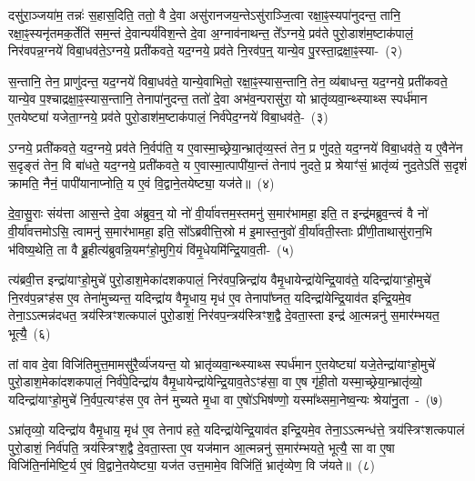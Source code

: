 दसु॑रा॒ञ्जया॑म॒ तन्नः॑ स॒हास॒दिति॒ ततो॒ वै दे॒वा असु॑रानजय॒न्ते\-ऽसु॑राञ्जि॒त्वा रक्षा॒ꣴ॒स्यपा॑नुदन्त॒ तानि॒ रक्षा॒ꣴ॒स्यनृ॑तमक॒र्तेति॑ सम॒न्तं दे॒वान्पर्य॑विश॒न्ते दे॒वा अ॒ग्नाव॑नाथन्त॒ ते᳚\-ऽग्नये॒ प्रव॑ते पुरो॒डाश॑\-म॒ष्टा\-क॑पालं॒ निर॑वपन्न॒ग्नये॑ विबा॒धव॑ते॒\-ऽग्नये॒ प्रती॑कवते॒ यद॒ग्नये॒ प्रव॑ते नि॒रव॑प॒न्॒ यान्ये॒व पु॒रस्ता॒द्रक्षा॒ꣴ॒स्या-~(२)

स॒न्तानि॒ तेन॒ प्राणु॑दन्त॒ यद॒ग्नये॑ विबा॒धव॑ते॒ यान्ये॒वाभितो॒ रक्षा॒ꣴ॒स्यास॒न्तानि॒ तेन॒ व्य॑बाधन्त॒ यद॒ग्नये॒ प्रती॑कवते॒ यान्ये॒व प॒श्चाद्रक्षा॒ꣴ॒स्यास॒न्तानि॒ तेनापा॑नुदन्त॒ ततो॑ दे॒वा अभ॑व॒न्परासु॑रा॒ यो भ्रातृ॑व्यवा॒न्थ्स्याथ्स स्पर्ध॑मान ए॒तयेष्ट्या॑ यजेता॒ग्नये॒ प्रव॑ते पुरो॒डाश॑\-म॒ष्टा\-क॑पालं॒ निर्व॑पेद॒ग्नये॑ विबा॒धव॑ते॒-~(३)

ऽग्नये॒ प्रती॑कवते॒ यद॒ग्नये॒ प्रव॑ते नि॒र्वप॑ति॒ य ए॒वास्मा॒\-च्छ्रेया॒न्भ्रातृ॑व्य॒स्तं तेन॒ प्र णु॑दते॒ यद॒ग्नये॑ विबा॒धव॑ते॒ य ए॒वैने॑न स॒दृङ्तं तेन॒ वि बा॑धते॒ यद॒ग्नये॒ प्रती॑कवते॒ य ए॒वास्मा॒त्पापी॑या॒न्तं तेनाप॑ नुदते॒ प्र श्रेयाꣳ॑सं॒ भ्रातृ॑व्यं नुद॒ते\-ऽति॑ स॒दृशं॑ क्रामति॒ नैनं॒ पापी॑यानाप्नोति॒ य ए॒वं वि॒द्वाने॒तयेष्ट्या॒ यज॑ते॥~(४)

{\anuvakamend[{वृ॒णा॒म॒है॒ यत्पु॒रस्ता॒द्रक्षाꣳ॑सि वपेद॒ग्नये॑ विबा॒धव॑त ए॒वं च॒त्वारि॑ च}]}%

दे॒वा॒सु॒राः संय॑त्ता आस॒न्ते दे॒वा अ॑ब्रुव॒न्॒ यो नो॑ वी॒र्या॑वत्तम॒स्तमनु॑ स॒मार॑भामहा॒ इति॒ त इन्द्र॑मब्रुव॒न्त्वं वै नो॑ वी॒र्या॑वत्तमो\-ऽसि॒ त्वामनु॑ स॒मार॑भामहा॒ इति॒ सो᳚\-ऽब्रवीत्ति॒स्रो म॑ इ॒मास्त॒नुवो॑ वी॒र्या॑वती॒स्ताः प्री॑णी॒ताथासु॑रान॒भि भ॑विष्य॒थेति॒ ता वै ब्रू॒हीत्य॑ब्रुवन्नि॒यमꣳ॑हो॒मुगि॒यं वि॑मृ॒धेयमि॑न्द्रि॒याव॒ती-~(५)

त्य॑ब्रवी॒त्त इन्द्रा॑याꣳहो॒मुचे॑ पुरो॒डाश॒मेका॑\-दश\-कपालं॒ निर॑वप॒न्निन्द्रा॑य वैमृ॒धायेन्द्रा॑येन्द्रि॒याव॑ते॒ यदिन्द्रा॑याꣳहो॒मुचे॑ नि॒रव॑प॒न्नꣳह॑स ए॒व तेना॑मुच्यन्त॒ यदिन्द्रा॑य वैमृ॒धाय॒ मृध॑ ए॒व तेनापा᳚घ्नत॒ यदिन्द्रा॑येन्द्रि॒याव॑त इन्द्रि॒यमे॒व तेना॒\-ऽऽ\-त्मन्न॑दधत॒ त्रय॑स्त्रिꣳशत्कपालं पुरो॒डाशं॒ निर॑वप॒न्त्रय॑स्त्रिꣳश॒द्वै दे॒वता॒स्ता इन्द्र॑ आ॒त्मन्ननु॑ स॒मार॑म्भयत॒ भूत्यै॒~(६)

तां वाव दे॒वा विजि॑तिमुत्त॒मामसु॑रै॒र्व्य॑जयन्त॒ यो भ्रातृ॑व्यवा॒न्थ्स्याथ्स स्पर्ध॑मान ए॒तयेष्ट्या॑ यजे॒तेन्द्रा॑याꣳहो॒मुचे॑ पुरो॒डाश॒मेका॑\-दश\-कपालं॒ निर्व॑पे॒दिन्द्रा॑य वैमृ॒धायेन्द्रा॑येन्द्रि॒याव॒ते\-ऽꣳह॑सा॒ वा ए॒ष गृ॑ही॒तो यस्मा॒च्छ्रेया॒न्भ्रातृ॑व्यो॒ यदिन्द्रा॑याꣳहो॒मुचे॑ नि॒र्वप॒त्यꣳह॑स ए॒व तेन॑ मुच्यते मृ॒धा वा ए॒षो॑\-ऽभिष॑ण्णो॒ यस्मा᳚थ्समा॒नेष्व॒न्यः श्रेया॑नु॒ता~-~(७)

ऽभ्रा॑तृव्यो॒ यदिन्द्रा॑य वैमृ॒धाय॒ मृध॑ ए॒व तेनाप॑ हते॒ यदिन्द्रा॑येन्द्रि॒याव॑त इन्द्रि॒यमे॒व तेना॒\-ऽऽ\-त्मन्ध॑त्ते॒ त्रय॑स्त्रिꣳशत्कपालं पुरो॒डाशं॒ निर्व॑पति॒ त्रय॑स्त्रिꣳश॒द्वै दे॒वता॒स्ता ए॒व यज॑मान आ॒त्मन्ननु॑ स॒मार॑म्भयते॒ भूत्यै॒ सा वा ए॒षा विजि॑ति॒र्नामेष्टि॒र्य ए॒वं वि॒द्वाने॒तयेष्ट्या॒ यज॑त उत्त॒मामे॒व विजि॑तिं॒ भ्रातृ॑व्येण॒ वि ज॑यते॥~(८)

